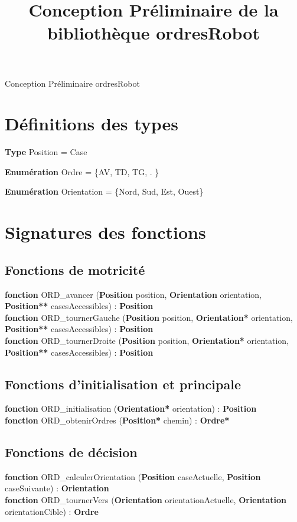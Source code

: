\documentclass[a4paper, 11pt]{article}
\title{Conception Préliminaire de la bibliothèque ordresRobot}
\author{}
\date{}
\begin{document}
%
%
\selectfont
\begin{center}
    \Huge{Conception Préliminaire ordresRobot}\\
\end{center}


\section*{Définitions des types}

\indent\textbf{Type} Position = Case

\indent\textbf{Enumération} Ordre = \{AV, TD, TG, . \}

\indent\textbf{Enumération} Orientation = \{Nord, Sud, Est, Ouest\}


\section*{Signatures des fonctions}

\subsection*{Fonctions de motricité}

\noindent\textbf{fonction} ORD\_avancer (\textbf{Position} position, \textbf{Orientation} orientation, \textbf{Position**} casesAccessibles) : \textbf{Position}\\
\noindent\textbf{fonction} ORD\_tournerGauche (\textbf{Position} position, \textbf{Orientation*} orientation, \textbf{Position**} casesAccessibles) : \textbf{Position}\\
\noindent\textbf{fonction} ORD\_tournerDroite (\textbf{Position} position, \textbf{Orientation*} orientation, \textbf{Position**} casesAccessibles) : \textbf{Position}\

\subsection*{Fonctions d'initialisation et principale}

\noindent\textbf{fonction} ORD\_initialisation (\textbf{Orientation*} orientation) : \textbf{Position}\\
\noindent\textbf{fonction} ORD\_obtenirOrdres (\textbf{Position*} chemin) : \textbf{Ordre*}\

\subsection*{Fonctions de décision}
\noindent\textbf{fonction} ORD\_calculerOrientation (\textbf{Position} caseActuelle, \textbf{Position} caseSuivante) : \textbf{Orientation}\\
\noindent\textbf{fonction} ORD\_tournerVers (\textbf{Orientation} orientationActuelle, \textbf{Orientation} orientationCible) : \textbf{Ordre}\\
\end{document}
